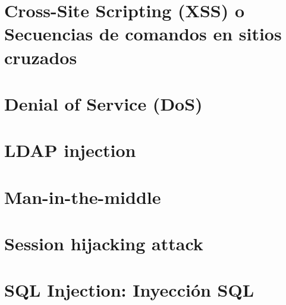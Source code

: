 \documentclass[10pt, a4paper,spanish]{article}
\begin{document}
        \paragraph{}


    \section{Cross-Site Scripting (XSS) o Secuencias de comandos en sitios cruzados}
        \paragraph{}


    \section{Denial of Service (DoS)}
        \paragraph{}


    \section{LDAP injection}
        \paragraph{}


    \section{Man-in-the-middle}
        \paragraph{}


    \section{Session hijacking attack}
        \paragraph{}


    \section{SQL Injection: Inyección SQL}
        \paragraph{}
\end{document}
